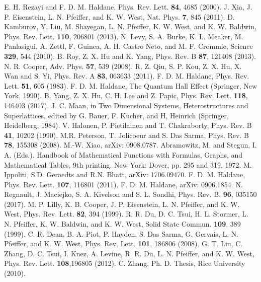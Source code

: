 \documentclass[twocolumn,showpacs,amsmath,amstex,amssymb,mathfonts,prb]{revtex4-1}
\begin{document}
\begin{thebibliography}{99}
 E. H. Rezayi and F. D. M. Haldane, Phys. Rev. Lett. {\bf 84}, 4685 (2000).
 J. Xia, J. P. Eisenstein, L. N. Pfeiffer, and K. W. West, Nat. Phys. {\bf 7}, 845 (2011).
 D. Kamburov, Y. Liu, M. Shayegan, L. N. Pfeiffer, K. W. West, and K. W. Baldwin, Phys. Rev. Lett. {\bf 110}, 206801 (2013).
 N. Levy, S. A. Burke, K. L. Meaker, M. Panlasigui, A. Zettl, F. Guinea, A. H. Castro Neto, and M. F. Crommie, Science {\bf 329}, 544 (2010).
 B. Roy, Z. X. Hu and K. Yang, Phys. Rev. B {\bf 87}, 121408 (2013).
 N. R. Cooper, Adv. Phys. {\bf 57}, 539 (2008).
 R. Z. Qiu, S. P. Kou, Z. X. Hu, X. Wan and S. Yi, Phys. Rev. A {\bf 83}, 063633 (2011).
 F. D. M. Haldane, Phys. Rev. Lett. {\bf 51}, 605 (1983).
 F. D. M. Haldane, The Quantum Hall Effect (Springer, New York, 1990).
 B. Yang, Z. X. Hu, C. H. Lee and Z. Papic, Phys. Rev. Lett. {\bf 118}, 146403 (2017).
 J. C. Maan, in Two Dimensional Systems, Heterostructures and Superlattices, edited by G. Bauer, F. Kucher, and H, Heinrich (Springer, Heidelberg, 1984).
 V. Halonen, P. Pietilainen and T. Chakraborty, Phys. Rev. B {\bf 41}, 10202 (1990).
 M.R. Peterson, T. Jolicoeur and S. Das Sarma, Phys. Rev. B {\bf 78}, 155308 (2008).
 M.-W. Xiao, arXiv: 0908.0787.
 Abramowitz, M. and Stegun, I. A. (Eds.). Handbook of Mathematical Functions with Formulas, Graphs, and Mathematical Tables, 9th printing. New York: Dover, pp. 295 and 319, 1972.
 M. Ippoliti, S.D. Geraedts and R.N. Bhatt, arXiv: 1706.09470.
 F. D. M. Haldane, Phys. Rev. Lett. {\bf 107}, 116801 (2011).
 F. D. M. Haldane, arXiv: 0906.1854.
 N. Regnault, J. Maciejko, S. A. Kivelson and S. L. Sondhi, Phys. Rev. B. {\bf 96}, 035150 (2017).
 M. P. Lilly, K. B. Cooper, J. P. Eisenstein, L. N. Pfeiffer, and K. W. West, Phys. Rev. Lett. {\bf 82}, 394 (1999).
 R. R. Du, D. C. Tsui, H. L. Stormer, L. N. Pfeiffer, K. W. Baldwin, and K. W. West, Solid State Commun. {\bf 109}, 389 (1999).
 C. R. Dean, B. A. Piot, P. Hayden, S. Das Sarma, G. Gervais, L. N. Pfeiffer, and K. W. West, Phys. Rev. Lett. {\bf 101}, 186806 (2008).
 G. T.  Liu, C. Zhang, D. C. Tsui, I. Knez, A. Levine, R. R. Du, L. N. Pfeiffer, and K. W. West, Phys. Rev. Lett. {\bf 108},196805 (2012).
 C. Zhang, Ph. D. Thesis, Rice University (2010).

\end{thebibliography}
\end{document}
